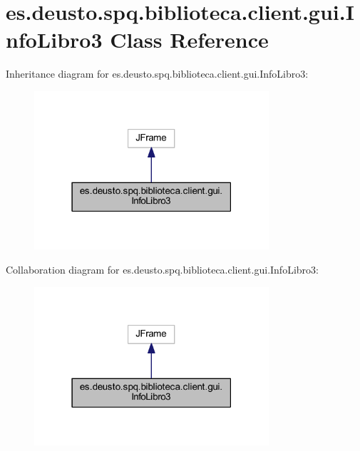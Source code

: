 \hypertarget{classes_1_1deusto_1_1spq_1_1biblioteca_1_1client_1_1gui_1_1_info_libro3}{}\section{es.\+deusto.\+spq.\+biblioteca.\+client.\+gui.\+Info\+Libro3 Class Reference}
\label{classes_1_1deusto_1_1spq_1_1biblioteca_1_1client_1_1gui_1_1_info_libro3}


Inheritance diagram for es.\+deusto.\+spq.\+biblioteca.\+client.\+gui.\+Info\+Libro3\+:
\nopagebreak
\begin{figure}[H]
\begin{center}
\leavevmode
\includegraphics[width=247pt]{classes_1_1deusto_1_1spq_1_1biblioteca_1_1client_1_1gui_1_1_info_libro3__inherit__graph}
\end{center}
\end{figure}


Collaboration diagram for es.\+deusto.\+spq.\+biblioteca.\+client.\+gui.\+Info\+Libro3\+:
\nopagebreak
\begin{figure}[H]
\begin{center}
\leavevmode
\includegraphics[width=247pt]{classes_1_1deusto_1_1spq_1_1biblioteca_1_1client_1_1gui_1_1_info_libro3__coll__graph}
\end{center}
\end{figure}
